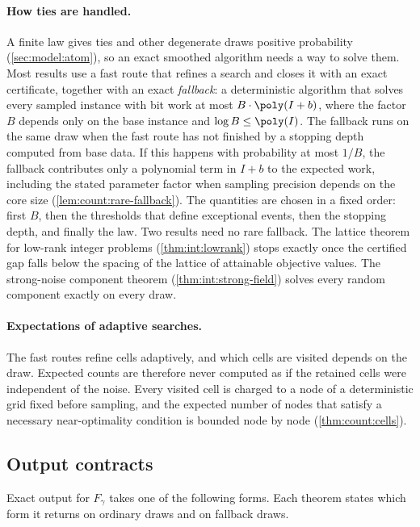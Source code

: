 \paragraph{How ties are handled.}
A finite law gives ties and other degenerate draws positive probability
(\cref{sec:model:atom}), so an exact smoothed algorithm needs a way to
solve them. Most results use a fast route that refines a search and closes
it with an exact certificate, together with an exact \emph{fallback}: a
deterministic algorithm that solves every sampled instance with bit work at
most $B\cdot\poly(I+b)$, where the factor $B$ depends only on the base
instance and $\log B\le\poly(I)$. The fallback runs on the same draw when
the fast route has not finished by a stopping depth computed from base data.
If this happens with probability at most $1/B$, the fallback contributes
only a polynomial term in $I+b$ to the expected work, including the stated
parameter factor when sampling precision depends on the core size
(\cref{lem:count:rare-fallback}). The quantities are chosen in a fixed order:
first $B$, then the thresholds that define exceptional events, then the
stopping depth, and finally the law. Two results need no rare fallback. The
lattice theorem for low-rank integer problems (\cref{thm:int:lowrank}) stops
exactly once the certified gap falls below the spacing of the lattice of
attainable objective values. The strong-noise component theorem
(\cref{thm:int:strong-field}) solves every random component exactly on every
draw.

\paragraph{Expectations of adaptive searches.}
The fast routes refine cells adaptively, and which cells are visited
depends on the draw. Expected counts are therefore never computed as if the
retained cells were independent of the noise. Every visited cell is charged
to a node of a deterministic grid fixed before sampling, and the expected
number of nodes that satisfy a necessary near-optimality condition is
bounded node by node (\cref{thm:count:cells}).

\subsection{Output contracts}\label{sec:model:outputs}

Exact output for $F_\gamma$ takes one of the following forms. Each theorem
states which form it returns on ordinary draws and on fallback draws.

